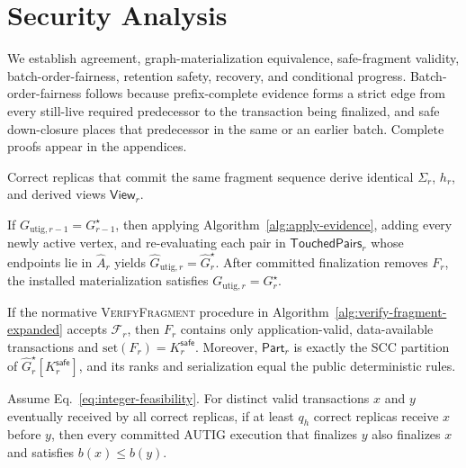 \section{Security Analysis}
\label{sec:analysis}

We establish agreement, graph-materialization equivalence, safe-fragment validity, batch-order-fairness, retention safety, recovery, and conditional progress.  Batch-order-fairness follows because prefix-complete evidence forms
a strict edge from every still-live required predecessor to the transaction being finalized, and safe down-closure places that predecessor in the same or an earlier batch. Complete proofs appear in the appendices.

\begin{theorem}
\label{thm:state-agreement}
Correct replicas that commit the same fragment sequence derive identical $\Sigma_r$, $h_r$, and derived views $\mathsf{View}_r$.
\end{theorem}

\begin{theorem}
\label{thm:incremental-equivalence}
If $G_{\mathrm{utig},r-1}=G_{r-1}^\star$, then applying
Algorithm~\ref{alg:apply-evidence}, adding every newly active vertex, and re-evaluating each pair in $\mathsf{TouchedPairs}_r$ whose endpoints lie in
$\widehat A_r$ yields
$\widehat G_{\mathrm{utig},r}=\widehat G_r^\star$.
After committed finalization removes $F_r$, the installed materialization satisfies $G_{\mathrm{utig},r}=G_r^\star$.
\end{theorem}

\begin{theorem}
\label{thm:safe-fragment}
If the normative \textsc{VerifyFragment} procedure in
Algorithm~\ref{alg:verify-fragment-expanded} accepts $\mathcal F_r$, then $F_r$ contains only application-valid, data-available transactions and $\mathrm{set}(F_r)=K_r^{\mathsf{safe}}$.
Moreover, $\mathsf{Part}_r$ is exactly the SCC partition of
$\widehat G_r^\star[K_r^{\mathsf{safe}}]$, and its ranks and serialization equal the public deterministic rules.
\end{theorem}

\begin{theorem}
\label{thm:batch-fairness}
Assume Eq.~\eqref{eq:integer-feasibility}.
For distinct valid transactions $x$ and $y$ eventually received by all correct replicas, if at least $q_h$ correct replicas receive $x$ before $y$, then every committed AUTIG execution that finalizes $y$ also finalizes $x$ and satisfies $b(x)\le b(y)$.
\end{theorem}


